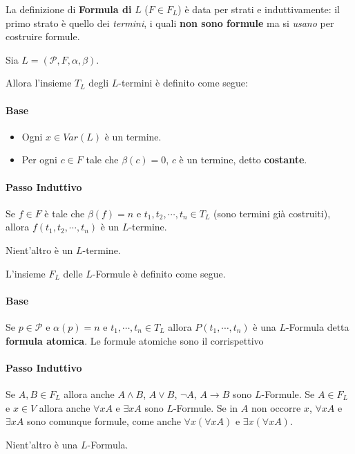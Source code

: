 \begin{defi}[Formule]
La definizione di \textbf{Formula di} $L$ ($F \in F_L$) è data per strati 
e induttivamente: il primo strato è quello dei \textit{termini}, 
i quali \textbf{non sono formule} ma si \textit{usano} per costruire formule.

\begin{defi}[$L$-termini]
        Sia $L = (\mathcal{P}, F, \alpha, \beta)$. 

        Allora l'insieme $T_L$ degli $L$-termini è definito come segue: 

        \paragraph{Base} 
        \begin{itemize}
                \item Ogni $x \in Var(L)$ è  un termine. 
                \item Per ogni $c \in F$ tale che $\beta(c) = 0$, $c$ è un termine, 
        detto \textbf{costante}. 
        \end{itemize}

        \paragraph{Passo Induttivo} Se $f \in F$ è tale che $\beta(f) = n$ e 
        $t_1, t_2, \cdots, t_n \in T_L$ (sono termini già costruiti), 
        allora $f(t_1, t_2, \cdots, t_n)$ è un $L$-termine. 
        
        Nient'altro è un $L$-termine.
\end{defi}

        L'insieme $F_L$ delle $L$-Formule è definito come segue. 

        \paragraph{Base} Se $p \in \mathcal{P}$ e $\alpha(p)=n$ e $t_1, \cdots, t_n \in T_L$
        allora $P(t_1, \cdots, t_n)$ è una $L$-Formula detta 
        \textbf{formula atomica}. Le formule atomiche sono il corrispettivo 

        \paragraph{Passo Induttivo} Se $A,B \in F_L$ allora anche 
        $A \land B$, $A \lor B$, $\neg A$, $A\rightarrow B$ sono $L$-Formule.
        Se $A \in F_L$ e $x \in V$ allora anche $\forall x A$ e $\exists x A$
        sono $L$-Formule. Se in $A$ non occorre $x$, $\forall x A$ 
        e $\exists x A$ sono comunque formule, come anche 
        $\forall x (\forall x A)$ e $\exists x (\forall x A)$. 

        Nient'altro è una $L$-Formula.
\end{defi}

